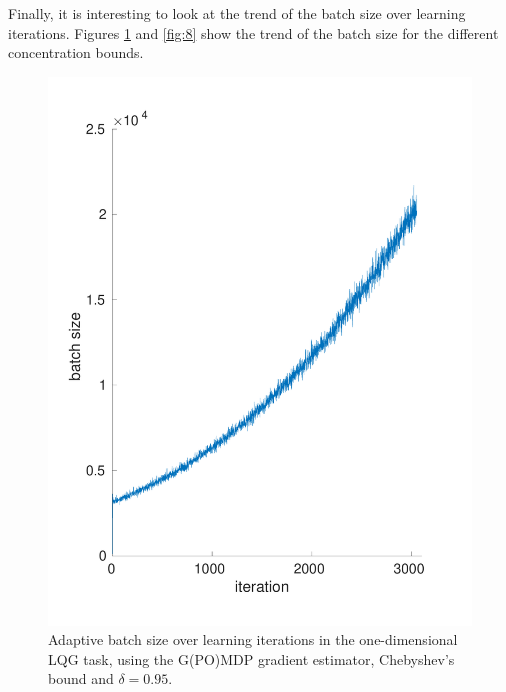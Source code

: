 Finally, it is interesting to look at the trend of the batch size over learning iterations. Figures \ref{fig:3} and \ref{fig:8} show the trend of the batch size for the different concentration bounds.

\begin{figure}[t!]
\includegraphics[width = \textwidth]{Images/batchsize_cheb.pdf}
\caption[Adaptive batch size over learning iterations in the one-dimensional LQG task using Chebyshev's bound.]{Adaptive batch size over learning iterations in the one-dimensional \ac{LQG} task, using the G(PO)MDP gradient estimator, Chebyshev's bound and $\delta=0.95$.}
\label{fig:3}
\end{figure}

